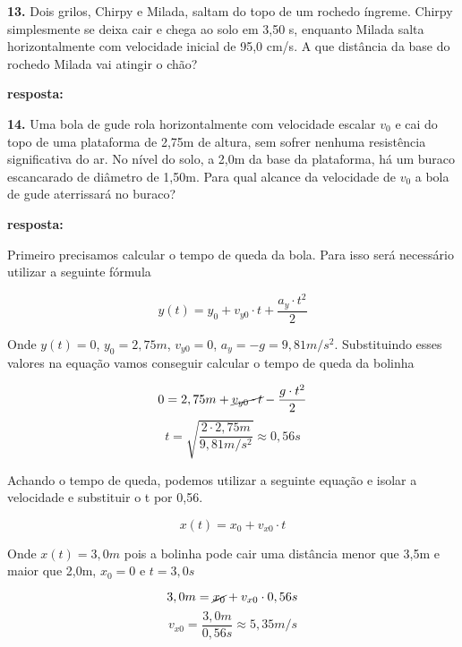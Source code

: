 \documentclass[a4paper, 12pt]{article}
\begin{document}
\begin{flushleft}
		\vspace{2em}
		
		\textbf{13.} Dois grilos, Chirpy e Milada, saltam do topo de um rochedo íngreme. Chirpy simplesmente se deixa cair e chega ao solo em 3,50 s, enquanto Milada salta horizontalmente com velocidade inicial de 95,0 cm/s. A que distância da base do rochedo Milada vai atingir o chão?
		
		\textbf{resposta:}
		
		\vspace{2em}
		
		\textbf{14.} Uma bola de gude rola horizontalmente com velocidade escalar $v_0$ e cai do topo de uma plataforma de 2,75m de altura, sem sofrer nenhuma resistência significativa do ar. No nível do solo, a 2,0m da base da plataforma, há um buraco escancarado de diâmetro de 1,50m. Para qual alcance da velocidade de $v_0$ a bola de gude aterrissará no buraco?
		
		\textbf{resposta:}
		
		Primeiro precisamos calcular  o tempo de queda da bola. Para isso será necessário utilizar a seguinte fórmula
		
		\begin{equation*}
			y(t) = y_0 + v_{y0} \cdot t + \frac{a_y \cdot t^2}{2}
		\end{equation*}
		
		Onde $y(t) = 0$, $y_0 = 2,75m$, $v_{y0} = 0$, $a_y = -g = 9,81 m/s^2$. Substituindo esses valores na equação vamos conseguir calcular o tempo de queda da bolinha
		
		\begin{equation*}
			0 = 2,75m + \cancel{v_{y0} \cdot t} - \frac{g \cdot t^2}{2}
		\end{equation*}
		\begin{equation*}
			t = \sqrt{\frac{2 \cdot 2,75 m}{9,81 m/s^2}} \approx 0,56s
		\end{equation*}
		
		Achando o tempo de queda, podemos utilizar a seguinte equação e isolar a velocidade e substituir o t por 0,56.
		
		\begin{equation*}
			x(t) = x_0 + v_{x0} \cdot t
		\end{equation*}
		
		Onde $x(t) = 3,0m$ pois a bolinha pode cair uma distância menor que 3,5m e maior que 2,0m, $x_0=0$ e $t=3,0s$ 
		
		\begin{equation*}
			3,0m = \cancel{x_0} + v_{x0} \cdot 0,56s
		\end{equation*}
		\begin{equation*}
			v_{x0} = \frac{3,0m}{0,56s} \approx 5,35 m/s
		\end{equation*}
		

\end{flushleft}
\end{document}
